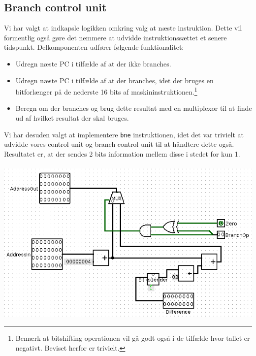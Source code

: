 \subsection{Branch control unit}
Vi har valgt at indkapsle logikken omkring valg at næste instruktion. Dette vil
formentlig også gøre det nemmere at udvidde instruktionssættet et senere
tidspunkt. Delkomponenten udfører følgende funktionalitet:

\begin{itemize}
\item Udregn næste PC i tilfælde af at der ikke branches.
\item Udregn næste PC i tilfælde af at der branches, idet der bruges en
bitforlænger på de nederste 16 bits af maskininstruktionen.\footnote{Bemærk at
bitshifting operationen vil gå godt også i de tilfælde hvor tallet er negativt.
Beviset herfor er trivielt.}
\item Beregn om der branches og brug dette resultat med en multiplexor til at
finde ud af hvilket resultat der skal bruges.
\end{itemize}

Vi har desuden valgt at implementere {\tt bne} instruktionen, idet det var
trivielt at udvidde vores control unit og branch control unit til at håndtere
dette også. Resultatet er, at der sendes 2 bits information mellem disse i
stedet for kun 1. \\
\\
\includegraphics[angle=90]{Billeder/single_cycle_branch.png}

